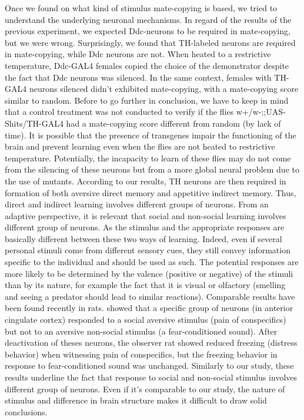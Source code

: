 \documentclass[a4paper, 12pt]{article}
\begin{document}
\medskip



Once we found on what kind of stimulus mate-copying is based, we tried to understand the underlying neuronal mechanisms. In regard of the results of the previous experiment, we expected Ddc-neurons to be required in mate-copying, but we were wrong.
Surprisingly, we found that TH-labeled neurons are required in mate-copying, while Ddc neurons are not. When heated to a restrictive temperature, Ddc-GAL4 females copied the choice of the demonstrator despite the fact that Ddc neurons was silenced. In the same context, females with TH-GAL4 neurons silenced didn't exhibited mate-copying, with a mate-copying score similar to random. Before to go further in conclusion, we have to keep in mind that a control treatment was not conducted to verify if the flies w+/w-;;UAS-Shits/TH-GAL4 had a mate-copying score different from random (by lack of time). It is possible that the presence of transgenes impair the functioning of the brain and prevent learning even when the flies are not heated to restrictive temperature. Potentially, the incapacity to learn of these flies may do not come from the silencing of these neurons but from a more global neural problem due to the use of mutants.
According to our results, TH neurons are then required in formation of both aversive direct memory and appetitive indirect memory.
Thus, direct and indirect learning involves different groups of neurons.
From an adaptive perspective, it is relevant that social and non-social learning involves different group of neurons. As the stimulus and the appropriate responses are basically different between these two ways of learning. Indeed, even if several personal stimuli come from different sensory cues, they still convey information specific to the individual and should be used as such. The potential responses are more likely to be determined by the valence (positive or negative) of the stimuli than by its nature, for example the fact that it is visual or olfactory (smelling and seeing a predator should lead to similar reactions).
Comparable results have been found recently in rats. \textcite{carrillo_emotional_2018} showed that a specific group of neurons (in anterior cingulate cortex) responded to a social aversive stimulus (pain of conspecifics) but not to an aversive non-social stimulus (a fear-conditioned sound). After deactivation of theses neurons, the observer rat showed reduced freezing (distress behavior) when witnessing pain of conspecifics, but the freezing behavior in response to fear-conditioned sound was unchanged. Similarly to our study, these results underline the fact that response to social and non-social stimulus involves different group of neurons. Even if it's comparable to our study, the nature of stimulus and difference in brain structure makes it difficult to draw solid conclusions. 
\end{document}
